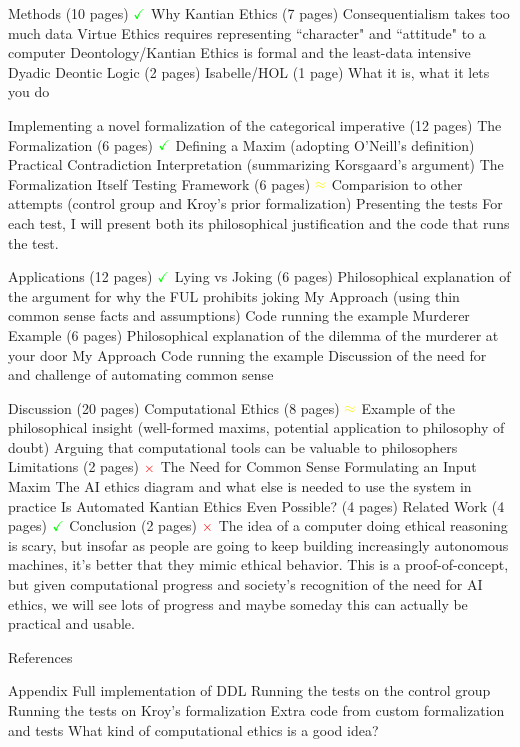 \documentclass[11pt]{article}
\begin{document}
\begin{outline}[enumerate]
\1 Methods (10 pages) \hfill $\color{green} \mathbf{\checkmark} \color{black}$
\2 Why Kantian Ethics (7 pages)
\3 Consequentialism takes too much data
\3 Virtue Ethics requires representing ``character" and ``attitude" to a computer
\3 Deontology/Kantian Ethics is formal and the least-data intensive
\2 Dyadic Deontic Logic (2 pages) 
\2 Isabelle/HOL (1 page) 
\3 What it is, what it lets you do

\1 Implementing a novel formalization of the categorical imperative (12 pages)
\2 The Formalization (6 pages) \hfill $\color{green} \mathbf{\checkmark} \color{black}$
\3 Defining a Maxim (adopting O'Neill's definition) 
\3 Practical Contradiction Interpretation (summarizing Korsgaard's argument)
\3 The Formalization Itself 
\2 Testing Framework (6 pages)  \hfill $\color{yellow} \mathbf{\approx} \color{black}$
\3 Comparision to other attempts (control group and Kroy's prior formalization)
\3 Presenting the tests
\4 For each test, I will present both its philosophical justification and the code that runs the test.

\1 Applications (12 pages) \hfill $\color{green} \mathbf{\checkmark} \color{black}$
\2 Lying vs Joking (6 pages)
\3 Philosophical explanation of the argument for why the FUL prohibits joking
\3 My Approach (using thin common sense facts and assumptions)
\3 Code running the example
\2 Murderer Example (6 pages)
\3 Philosophical explanation of the dilemma of the murderer at your door
\3 My Approach 
\3 Code running the example
\3 Discussion of the need for and challenge of automating common sense 

\1 Discussion (20 pages)
\2 Computational Ethics (8 pages) \hfill $\color{yellow} \mathbf{\approx} \color{black}$
\3 Example of the philosophical insight (well-formed maxims, potential application to philosophy of doubt)
\3 Arguing that computational tools can be valuable to philosophers
\2 Limitations (2 pages) \hfill $\color{red} \mathbf{\times} \color{black}$
\3 The Need for Common Sense 
\3 Formulating an Input Maxim
\3 The AI ethics diagram and what else is needed to use the system in practice
\2 Is Automated Kantian Ethics Even Possible? (4 pages)
\2 Related Work (4 pages) \hfill $\color{green} \mathbf{\checkmark} \color{black}$
\2 Conclusion (2 pages) \hfill $\color{red} \mathbf{\times} \color{black}$
\3 The idea of a computer doing ethical reasoning is scary, but insofar as people are going to keep
building increasingly autonomous machines, it's better that they mimic ethical behavior. 
\3 This is a proof-of-concept, but given computational progress and society's recognition of the need for
AI ethics, we will see lots of progress and maybe someday this can actually be practical and usable.

\1 References 

\1 Appendix 
\2 Full implementation of DDL
\2 Running the tests on the control group 
\2 Running the tests on Kroy's formalization
\2 Extra code from custom formalization and tests
\2 What kind of computational ethics is a good idea? 


\end{outline}
\end{document}
